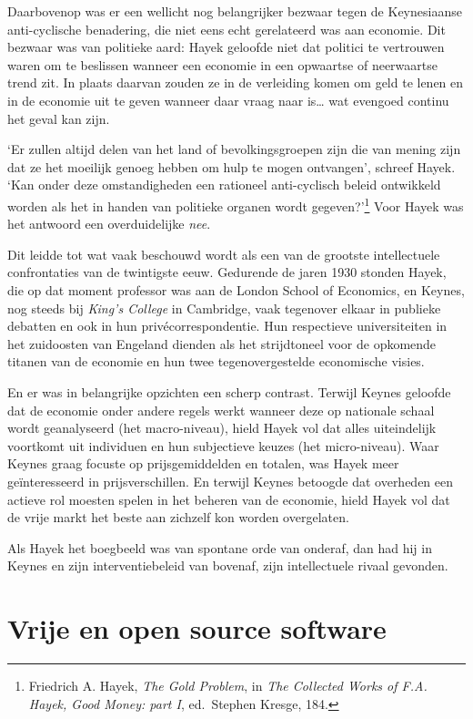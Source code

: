 \documentclass[
  a5paper,
  smalldemyvopaper,11pt,twoside,onecolumn,openright,extrafontsizes,
hidelinks]{memoir}
\begin{document}
Daarbovenop was er een wellicht nog belangrijker bezwaar tegen de
Keynesiaanse anti-cyclische benadering, die niet eens echt gerelateerd
was aan economie. Dit bezwaar was van politieke aard: Hayek geloofde
niet dat politici te vertrouwen waren om te beslissen wanneer een
economie in een opwaartse of neerwaartse trend zit. In plaats daarvan
zouden ze in de verleiding komen om geld te lenen en in de economie uit
te geven wanneer daar vraag naar is\ldots{} wat evengoed continu het
geval kan zijn.

`Er zullen altijd delen van het land of bevolkingsgroepen zijn die van
mening zijn dat ze het moeilijk genoeg hebben om hulp te mogen
ontvangen', schreef Hayek. `Kan onder deze omstandigheden een rationeel
anti-cyclisch beleid ontwikkeld worden als het in handen van politieke
organen wordt gegeven?'\footnote{\hspace{0pt}Friedrich A. Hayek,
  \emph{The Gold Problem}, in \emph{The Collected Works of F.A. Hayek,
  Good Money: part I}, ed.~Stephen Kresge, 184.} Voor Hayek was het antwoord een overduidelijke \emph{nee}.

Dit leidde tot wat vaak beschouwd wordt als een van de grootste
intellectuele confrontaties van de twintigste eeuw. Gedurende de jaren
1930 stonden Hayek, die op dat moment professor was aan de London School
of Economics, en Keynes, nog steeds bij \emph{King's College} in
Cambridge, vaak tegenover elkaar in publieke debatten en ook in hun
privécorrespondentie. Hun respectieve universiteiten in het zuidoosten
van Engeland dienden als het strijdtoneel voor de opkomende titanen van
de economie en hun twee tegenovergestelde economische visies.

En er was in belangrijke opzichten een scherp contrast. Terwijl Keynes
geloofde dat de economie onder andere regels werkt wanneer deze op
nationale schaal wordt geanalyseerd (het macro-niveau), hield Hayek vol
dat alles uiteindelijk voortkomt uit individuen en hun subjectieve
keuzes (het micro-niveau). Waar Keynes graag focuste op prijsgemiddelden
en totalen, was Hayek meer geïnteresseerd in prijsverschillen. En
terwijl Keynes betoogde dat overheden een actieve rol moesten spelen in
het beheren van de economie, hield Hayek vol dat de vrije markt het
beste aan zichzelf kon worden overgelaten.

Als Hayek het boegbeeld was van spontane orde van onderaf, dan had hij
in Keynes en zijn interventiebeleid van bovenaf, zijn 
intellectuele rivaal gevonden.

\chapter{Vrije en open source
software}\label{vrije-en-open-source-software}
\end{document}
